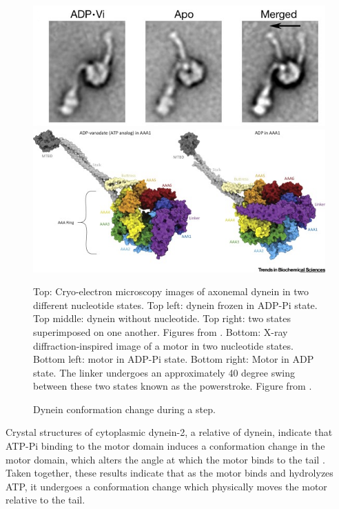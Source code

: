 \documentclass[
11pt, %
english, %
singlespacing, %
headsepline, %
chapterinoneline, %
]{MastersDoctoralThesis} %
\begin{document}
\begin{figure}[h]
  \centering
  \includegraphics[width=.65\textwidth,keepaspectratio]{../figures/burgess-dynein-angles}\\
  \hspace{1cm}
  \includegraphics[width=.95\textwidth,keepaspectratio]{../figures/linker-swing}
  \caption{Dynein conformation change during a step.}{Top: Cryo-electron microscopy images of axonemal dynein in two different nucleotide states. Top left: dynein frozen in ADP-Pi state. Top middle: dynein without nucleotide. Top right: two states superimposed on one another. Figures from \cite{burgess-paper}. Bottom: X-ray diffraction-inspired image of a motor in two nucleotide states. Bottom left: motor in ADP-Pi state. Bottom right: Motor in ADP state. The linker undergoes an approximately 40 degree swing between these two states known as the powerstroke. Figure from \cite{bhabha-paper}.}
  \label{fig:cryo-em-angles}
\end{figure}

Crystal structures of cytoplasmic dynein-2, a relative of dynein, indicate that ATP-Pi binding to the motor domain induces a conformation change in the motor domain, which alters the angle at which the motor binds to the tail \cite{carter-paper}. Taken together, these results indicate that as the motor binds and hydrolyzes ATP, it undergoes a conformation change which physically moves the motor relative to the tail.\\

\end{document}
